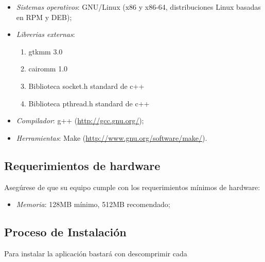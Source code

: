 \documentclass{article}
\begin{document}
	\begin{itemize}
	\itemsep=5pt \topsep=0pt \partopsep=0pt \parskip=0pt \parsep=0pt

		\item \textit{Sistemas operativos}: GNU/Linux (x86 y x86-64, distribuciones Linux basadas en RPM y DEB);

		\item \textit{Librerias externas}: \begin{enumerate}
							\item gtkmm 3.0
							\item cairomm 1.0
							\item Biblioteca socket.h standard de c++
							\item Biblioteca pthread.h standard de c++
							\end{enumerate}

		\item \textit{Compilador}: g++ (\url{http://gcc.gnu.org/});

		\item \textit{Herramientas}: Make (\url{http://www.gnu.org/software/make/}).

	\end{itemize}
\bigskip



\subsection{Requerimientos de hardware}
	
	Asegúrese de que su equipo cumple con los requerimientos mínimos de hardware:
	\medskip

	\begin{itemize}
	\itemsep=5pt \topsep=0pt \partopsep=0pt \parskip=0pt \parsep=0pt

		\item \textit{Memoria}: 128MB mínimo, 512MB recomendado;

	\end{itemize}
\bigskip



\subsection{Proceso de Instalación}
	
	Para instalar la aplicación bastará con descomprimir cada
\bigskip
\end{document}
